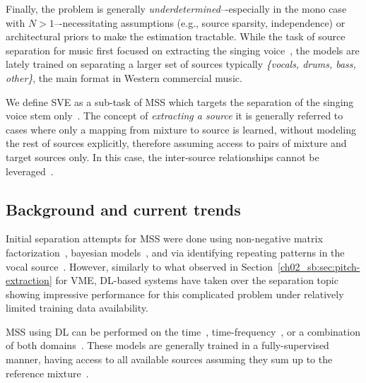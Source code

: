 Finally, the problem is generally \emph{underdetermined}–-especially in the mono case with \(N>1\)–-necessitating assumptions (e.g., source sparsity, independence) or architectural priors to make the estimation tractable.
%
While the task of source separation for music first focused on extracting the singing voice~\citep{vembu-separation,ozerov-bayesian_sep,rafii-repet}, the models are lately trained on separating a larger set of sources typically \textit{\{vocals, drums, bass, other\}}, the main format in Western commercial music. 


We define \acrfull{SVE} as a sub-task of \acrshort{MSS} which targets the separation of the singing voice stem only~\citep{rafii-overview}. The concept of \textit{extracting a source} it is generally referred to cases where only a mapping from mixture to source is learned, without modeling the rest of sources explicitly, therefore assuming access to pairs of mixture and target sources only. In this case, the inter-source relationships cannot be leveraged~\citep{zhu-instglow}.


%


\subsection{Background and current trends}
Initial separation attempts for \acrshort{MSS} were done using non-negative matrix factorization~\citep{vembu-separation}, bayesian models~\citep{ozerov-bayesian_sep}, and via identifying repeating patterns in the vocal source~\citep{rafii-repet}. However, similarly to what observed in Section~\ref{ch02_sb:sec:pitch-extraction} for \acrshort{VME}, \acrshort{DL}-based systems have taken over the separation topic showing impressive performance for this complicated problem under relatively limited training data availability. 

\acrshort{MSS} using \acrshort{DL} can be performed on the time~\citep{stoller-waveunet,defossez-demucs_waveform,lluis-end2end}, time-frequency~\citep{jansson-unet,takahashi-d3net}, or a combination of both domains~\citep{defossez-demucs_hybrid,kim-kuielab,yu-danna}. These models are generally trained in a fully-supervised manner, having access to all available sources assuming they sum up to the reference mixture~\citep{zhu-instglow}.



